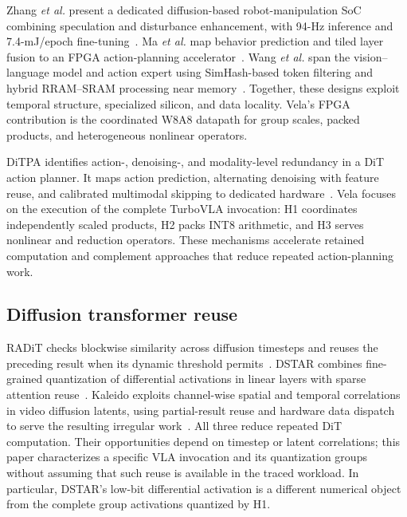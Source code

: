 \documentclass[journal,10pt]{IEEEtran}
\begin{document}
Zhang \emph{et al.} present a dedicated diffusion-based robot-manipulation SoC combining speculation and disturbance enhancement, with 94-Hz inference and 7.4-mJ/epoch fine-tuning~\cite{zhang2025robot_soc}. Ma \emph{et al.} map behavior prediction and tiled layer fusion to an FPGA action-planning accelerator~\cite{ma2025planner}. Wang \emph{et al.} span the vision--language model and action expert using SimHash-based token filtering and hybrid RRAM--SRAM processing near memory~\cite{wang2026vlaedge}. Together, these designs exploit temporal structure, specialized silicon, and data locality. Vela's FPGA contribution is the coordinated W8A8 datapath for group scales, packed products, and heterogeneous nonlinear operators.

DiTPA identifies action-, denoising-, and modality-level redundancy in a DiT action planner. It maps action prediction, alternating denoising with feature reuse, and calibrated multimodal skipping to dedicated hardware~\cite{ditpa}. Vela focuses on the execution of the complete TurboVLA invocation: H1 coordinates independently scaled products, H2 packs INT8 arithmetic, and H3 serves nonlinear and reduction operators. These mechanisms accelerate retained computation and complement approaches that reduce repeated action-planning work.

\subsection{Diffusion transformer reuse}
RADiT checks blockwise similarity across diffusion timesteps and reuses the preceding result when its dynamic threshold permits~\cite{park2025radit}. DSTAR combines fine-grained quantization of differential activations in linear layers with sparse attention reuse~\cite{zhang2026dstar}. Kaleido exploits channel-wise spatial and temporal correlations in video diffusion latents, using partial-result reuse and hardware data dispatch to serve the resulting irregular work~\cite{miao2026kaleido}. All three reduce repeated DiT computation. Their opportunities depend on timestep or latent correlations; this paper characterizes a specific VLA invocation and its quantization groups without assuming that such reuse is available in the traced workload. In particular, DSTAR's low-bit differential activation is a different numerical object from the complete group activations quantized by H1.
\end{document}
